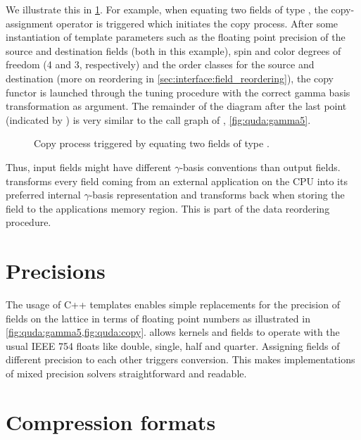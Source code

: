 
We illustrate this in \cref{fig:quda:copy}.
For example, when equating two fields of type , the copy-assignment operator is triggered which initiates the copy process.
After some instantiation of template parameters such as the floating point precision of the source  and destination  fields (both  in this example), spin and color degrees of freedom (\num{4} and \num{3}, respectively) and the order classes for the source and destination (more on reordering in \cref{sec:interface:field_reordering}), the copy functor  is launched through the tuning procedure with the correct gamma basis transformation as argument.
The remainder of the diagram after the last point (indicated by ) is very similar to the call graph of , \cref{fig:quda:gamma5}.
\begin{figure}
  
  \caption{Copy process triggered by equating two fields of type .}
  \label{fig:quda:copy}
\end{figure}

Thus, input fields might have different $\gamma$-basis conventions than output fields.
\Quda transforms every field coming from an external application on the CPU into its preferred internal $\gamma$-basis representation and transforms back when storing the field to the applications memory region.
This is part of the data reordering procedure.

\section{Precisions}

The usage of C++ templates enables simple replacements for the precision of fields on the lattice in terms of floating point numbers as illustrated in \cref{fig:quda:gamma5,fig:quda:copy}. \Quda allows kernels and fields to operate with the usual IEEE 754 floats like double, single, half and quarter. Assigning fields of different precision to each other triggers conversion. This makes implementations of mixed precision solvers straightforward and readable.

\section{Compression formats}
\label{quda:compresed_formats}

